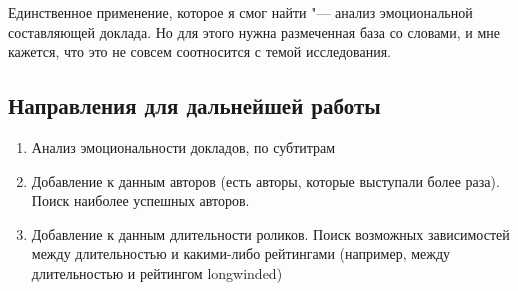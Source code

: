 \documentclass[12pt,a4paper]{scrartcl}
\begin{document}
Единственное применение, которое я смог найти "--- анализ эмоциональной составляющей доклада. Но для этого нужна размеченная база со словами, и мне кажется, что это не совсем соотносится с темой исследования.
\subsection{Направления для дальнейшей работы}
\begin{enumerate}
\item Анализ эмоциональности докладов, по субтитрам
\item Добавление к данным авторов (есть авторы, которые выступали более раза). Поиск наиболее успешных авторов.
\item Добавление к данным длительности роликов. Поиск возможных зависимостей между длительностью и какими-либо рейтингами (например, между длительностью и рейтингом longwinded)
\end{enumerate}
\end{document}
